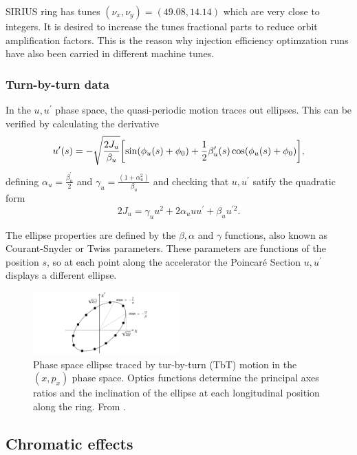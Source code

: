 SIRIUS ring has tunes $(\nu_x, \nu_y)=(49.08, 14.14)$ which are very close to integers. It is desired to increase the tunes fractional parts to reduce orbit amplification factors. This is the reason why injection efficiency optimzation runs have also been carried in different machine tunes.
\subsubsection{Turn-by-turn data}
In the $u, u^\prime$ phase space, the quasi-periodic motion traces out ellipses. This can be verified by calculating the derivative
    \begin{equation}
        u^{\prime}(s) = - \sqrt{\frac{2J_u}{\beta_u}}\qty[\sin(\phi_u(s) + \phi_0) + \frac{1}{2}\beta_u^\prime(s)\cos(\phi_u(s) + \phi_0)],
    \end{equation}
    defining $\alpha_u = \frac{\beta_u^\prime}{2}$  and $\gamma_u = \frac{(1+\alpha_u^2)}{\beta_u}$ and checking that $u, u^\prime$ satify the quadratic form
    \begin{equation}
        2J_u=\gamma_u u^{2}+2\alpha_u u u^{\prime}+\beta_u u^{\prime2}.
     \end{equation}

The ellipse properties are defined by the $\beta, \alpha$ and $\gamma$ functions, also known as Courant-Snyder or Twiss parameters. These parameters are functions of the position $s$, so at each point along the accelerator the Poincaré Section $u, u^\prime$ displays a different ellipse.
\begin{figure}[htb]
    \centering
    \includegraphics[width=0.5\textwidth]{Images/ellipse}
    \caption{Phase space ellipse traced by tur-by-turn (TbT) motion in the $(x,p_x)$ phase space. Optics functions determine the principal axes ratios and the inclination of the ellipse at each longitudinal position along the ring. From \cite{wolski2014beam}.}
    \label{ellipse}
\end{figure}
\subsection{Chromatic effects}

